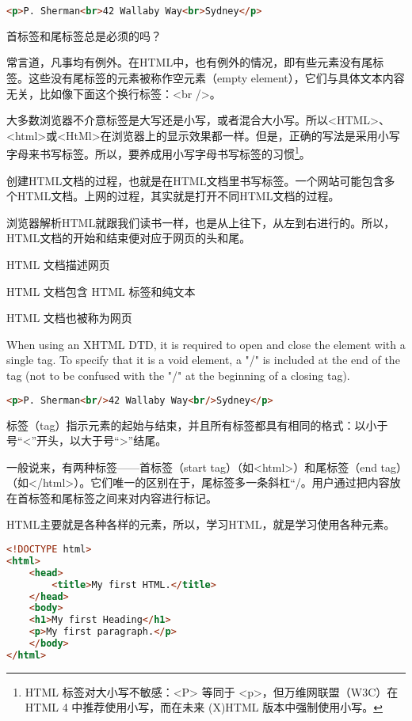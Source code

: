\begin{lstlisting}[language=HTML]
<p>P. Sherman<br>42 Wallaby Way<br>Sydney</p>
\end{lstlisting}

首标签和尾标签总是必须的吗？

常言道，凡事均有例外。在HTML中，也有例外的情况，即有些元素没有尾标签。这些没有尾标签的元素被称作空元素（empty element），它们与具体文本内容无关，比如像下面这个换行标签：<br />。

大多数浏览器不介意标签是大写还是小写，或者混合大小写。所以<HTML>、<html>或<HtMl>在浏览器上的显示效果都一样。但是，正确的写法是采用小写字母来书写标签。所以，要养成用小写字母书写标签的习惯\footnote{HTML 标签对大小写不敏感：<P> 等同于 <p>，但万维网联盟（W3C）在 HTML 4 中推荐使用小写，而在未来 (X)HTML 版本中强制使用小写。}。

创建HTML文档的过程，也就是在HTML文档里书写标签。一个网站可能包含多个HTML文档。上网的过程，其实就是打开不同HTML文档的过程。

浏览器解析HTML就跟我们读书一样，也是从上往下，从左到右进行的。所以，HTML文档的开始和结束便对应于网页的头和尾。

\begin{compactitem}
\item HTML 文档描述网页
\item HTML 文档包含 HTML 标签和纯文本
\item HTML 文档也被称为网页
\end{compactitem}

When using an XHTML DTD, it is required to open and close the element with a single tag. To specify that it is a void element, a "/" is included at the end of the tag (not to be confused with the "/" at the beginning of a closing tag).

\begin{lstlisting}[language=HTML]
<p>P. Sherman<br/>42 Wallaby Way<br/>Sydney</p>
\end{lstlisting}

标签（tag）指示元素的起始与结束，并且所有标签都具有相同的格式：以小于号“<”开头，以大于号“>”结尾。

一般说来，有两种标签——首标签（start tag）（如<html>）和尾标签（end tag）（如</html>）。它们唯一的区别在于，尾标签多一条斜杠“/。用户通过把内容放在首标签和尾标签之间来对内容进行标记。

HTML主要就是各种各样的元素，所以，学习HTML，就是学习使用各种元素。

\begin{lstlisting}[language=HTML]
<!DOCTYPE html>
<html>
	<head>
		<title>My first HTML.</title>
	</head>
	<body>
	<h1>My first Heading</h1>
	<p>My first paragraph.</p>
	</body>
</html>
\end{lstlisting}

